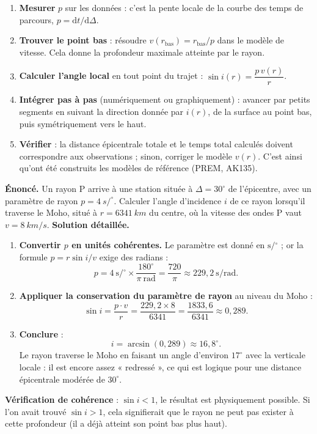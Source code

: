 \documentclass[11pt]{article}
\providecommand{\degree}{^{\circ}}
\begin{document}
\begin{methode}
\begin{enumerate}
\item \textbf{Mesurer} $p$ sur les données : c'est la pente locale de la courbe des temps de parcours, $p = \mathrm{d}t/\mathrm{d}\Delta$.
\item \textbf{Trouver le point bas} : résoudre $v(r_{\text{bas}}) = r_{\text{bas}}/p$ dans le modèle de vitesse. Cela donne la profondeur maximale atteinte par le rayon.
\item \textbf{Calculer l'angle local} en tout point du trajet : $\sin i(r) = \dfrac{p\,v(r)}{r}$.
\item \textbf{Intégrer pas à pas} (numériquement ou graphiquement) : avancer par petits segments en suivant la direction donnée par $i(r)$, de la surface au point bas, puis symétriquement vers le haut.
\item \textbf{Vérifier} : la distance épicentrale totale et le temps total calculés doivent correspondre aux observations ; sinon, corriger le modèle $v(r)$. C'est ainsi qu'ont été construits les modèles de référence (PREM, AK135).
\end{enumerate}
\end{methode}

\begin{exoresolu}
\textbf{Énoncé.} Un rayon P arrive à une station située à $\Delta = 30^{\circ}$ de l'épicentre, avec un paramètre de rayon $p = \SI{4}{s/\degree}$. Calculer l'angle d'incidence $i$ de ce rayon lorsqu'il traverse le Moho, situé à $r = \SI{6341}{km}$ du centre, où la vitesse des ondes P vaut $v = \SI{8}{km/s}$.
\tcblower
\textbf{Solution détaillée.}
\begin{enumerate}
\item \textbf{Convertir $p$ en unités cohérentes.} Le paramètre est donné en $\si{\second\per\degree}$ ; or la formule $p = r\sin i / v$ exige des radians :
\[ p = 4 \ \si{\second\per\degree} \times \frac{180^{\circ}}{\pi \ \si{\radian}} = \frac{720}{\pi} \approx 229{,}2 \ \si{\second\per\radian}. \]
\item \textbf{Appliquer la conservation du paramètre de rayon} au niveau du Moho :
\[ \sin i = \frac{p \cdot v}{r} = \frac{229{,}2 \times 8}{6341} = \frac{1833{,}6}{6341} \approx 0{,}289. \]
\item \textbf{Conclure} :
\[ i = \arcsin(0{,}289) \approx 16{,}8^{\circ}. \]
Le rayon traverse le Moho en faisant un angle d'environ $17^{\circ}$ avec la verticale locale : il est encore assez « redressé », ce qui est logique pour une distance épicentrale modérée de $30^{\circ}$.
\end{enumerate}
\textbf{Vérification de cohérence} : $\sin i < 1$, le résultat est physiquement possible. Si l'on avait trouvé $\sin i > 1$, cela signifierait que le rayon ne peut pas exister à cette profondeur (il a déjà atteint son point bas plus haut).
\end{exoresolu}
\end{document}
